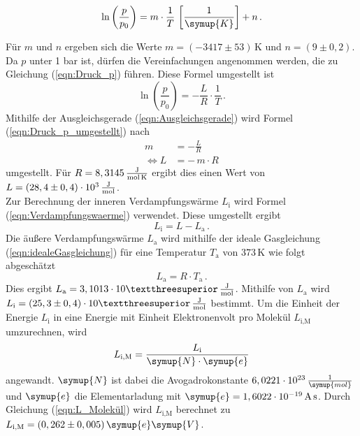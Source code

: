     \begin{equation}
      \label{eqn:Ausgleichsgerade}
      \ln{\left(\frac{p}{p_0}\right)} = m \cdot \frac{1}{T} \,\left[\frac{1}{\symup{K}}\right] + n \, . 
    \end{equation}

    Für $m$ und $n$ ergeben sich die Werte $m = (-3417 \pm 53) \, \unit{\kelvin}$
    und $n = (9 \pm 0,2)$.
    Da $p$ unter 1 bar ist, dürfen die Vereinfachungen angenommen werden, die zu Gleichung (\ref{eqn:Druck_p}) führen. Diese Formel umgestellt ist 
    \begin{equation}
      \label{eqn:Druck_p_umgestellt}
      \ln{\left(\frac{p}{p_0}\right)} = - \frac{L}{R} \cdot \frac{1}{T} \, . 
    \end{equation}
    Mithilfe der Ausgleichsgerade (\ref{eqn:Ausgleichsgerade}) wird Formel 
    (\ref{eqn:Druck_p_umgestellt}) nach 
    \begin{align}
      m &= - \frac{L}{R} \\
      \Leftrightarrow L &= - \, m \cdot R
    \end{align}
    umgestellt. Für $R = 8,3145 \, \unit[per-mode=fraction]{\joule\per\mol\per\kelvin}$ ergibt dies einen Wert von $L = (28,4 \pm 0,4) \cdot 10^3 \, \unit[per-mode=fraction]{\joule\per\mol}$.
    \\
    Zur Berechnung der inneren Verdampfungswärme $L_{\text{i}}$ wird Formel (\ref{eqn:Verdampfungswaerme}) verwendet. Diese umgestellt ergibt 
    \begin{equation}
      L_{\text{i}} = L - L_{\text{a}} \, . 
    \end{equation}
    Die äußere Verdampfungswärme $L_{\text{a}}$ wird mithilfe der ideale Gasgleichung (\ref{eqn:idealeGasgleichung}) für eine Temperatur $T_{\text{a}}$ von $373 \, \unit{\kelvin}$ wie folgt abgeschätzt
    \begin{equation}
      L_{\text{a}} = R \cdot  T_{\text{a}}\, . 
    \end{equation}
    Dies ergibt $L_{\text{a}} = 3,1013 \cdot 10³ \, \unit[per-mode=fraction]{\joule\per\mol}$. 
    Mithilfe von $L_{\text{a}}$ wird $L_{\text{i}} = (25,3 \pm 0,4) \cdot 10³ \, \unit[per-mode=fraction]{\joule\per\mol}$ bestimmt. 
    Um die Einheit der Energie $L_{\text{i}}$ in eine Energie mit Einheit Elektronenvolt pro Molekül $L_{\text{i,M}}$ umzurechnen, wird 
    \begin{equation}
      L_{\text{i,M}} = \frac{L_{\text{i}}}{\symup{N} \cdot \symup{e}}
      \label{eqn:L_Molekül}
    \end{equation}
    angewandt. $\symup{N}$ ist dabei die Avogadrokonstante $6,0221 \cdot 10^{23} \, \frac{1}{\symup{mol}}$ und $\symup{e}$ die Elementarladung mit 
    $\symup{e} = 1,6022 \cdot 10^{-19} \, \unit{\ampere\second}$. 
    Durch Gleichung (\ref{eqn:L_Molekül}) wird $L_{\text{i,M}}$ berechnet zu $L_{\text{i,M}} = (0,262 \pm 0,005) \, \symup{e}\symup{V}$.
    
